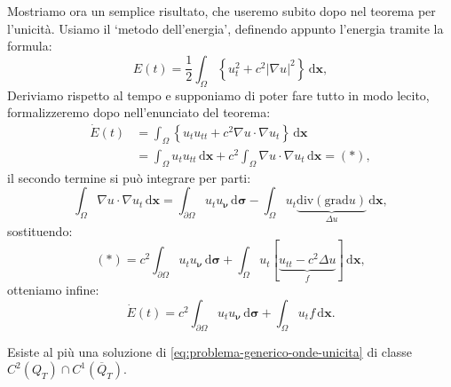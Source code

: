\documentclass[10pt,a4paper,twoside,openright]{book}
\newcommand{\x}{\mathbf{x}}
\newcommand{\sigg}{\bm{\sigma}}
\newcommand{\de}{\,\mathrm d}
\newcommand{\dxx}{\de \x}
\newcommand{\dsig}{\de \sigg}
\begin{document}
Mostriamo ora un semplice risultato, che useremo subito dopo nel teorema per l'unicità. Usiamo il `metodo dell'energia', definendo appunto l'energia tramite la formula:
\begin{equation}
	E(t) =\frac{1}{2}\int _{\Omega }\left\{u_{t}^{2} +c^{2}| \nabla u| ^{2}\right\} \dxx ,
\end{equation}
Deriviamo rispetto al tempo e supponiamo di poter fare tutto in modo lecito, formalizzeremo dopo nell'enunciato del teorema:
\begin{align*}
	\dot{E}(t) & =\int _{\Omega }\left\{u_{t} u_{tt} +c^{2} \nabla u\cdotp \nabla u_{t}\right\} \dxx                          \\
	            & =\int _{\Omega } u_{t} u_{tt} \dxx +c^{2}\int _{\Omega } \nabla u\cdotp \nabla u_{t} \dxx =(*) , 
\end{align*}
il secondo termine si può integrare per parti:
\begin{equation*}
	\int _{\Omega } \nabla u\cdotp \nabla u_{t} \dxx =\int _{\partial \Omega } u_{t} u_{\bm{\nu }} \dsig -\int _{\Omega } u_{t}\underbrace{\mathrm{div}(\mathrm{grad} u)}_{\Delta u} \dxx ,
\end{equation*}
sostituendo:
\begin{equation*}
	(*) =c^{2}\int _{\partial \Omega } u_{t} u_{\bm{\nu }} \dsig +\int _{\Omega } u_{t}[\underbrace{u_{tt} -c^{2} \Delta u}_{f}] \dxx ,
\end{equation*}
otteniamo infine:
\begin{equation}
	\dot{E}(t) =c^{2}\int _{\partial \Omega } u_{t} u_{\bm{\nu }} \dsig +\int _{\Omega } u_{t} f\dxx .
	\label{eq:onde-derivata-energia}
\end{equation}
\begin{theorem}
	Esiste al più una soluzione di \eqref{eq:problema-generico-onde-unicita} di classe $C^{2}(Q_{T}) \cap C^{1}(\overline{Q}_{T})$.
\end{theorem}
\end{document}
